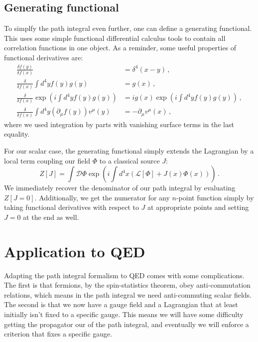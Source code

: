 \documentclass[12pt]{memoir}
\begin{document}
\subsection{Generating functional}

To simplfy the path integral even further, one can define a generating functional.
This uses some simple functional differential calculus tools to contain all correlation functions in one object.
As a reminder, some useful properties of functional derivatives are:
\begin{align}
  \frac{\delta f(y)}{\delta f(x)} & = \delta^4(x - y)\,, \\
  \frac{\delta}{\delta f(x)} \int d^4y f(y) g(y) &= g(x)\,, \\
  \frac{\delta}{\delta f(x)} \exp(i \int d^4y f(y) g(y)) &= i g(x) \exp(i \int d^4y f(y) g(y))\,, \\
  \frac{\delta}{\delta f(x)} \int d^4y (\partial_{\mu} f(y)) v^{\mu}(y) & = - \partial_{\mu} v^{\mu}(x)\,,
\end{align}
where we used integration by parts with vanishing surface terms in the last equality.

For our scalar case, the generating functional simply extends the Lagrangian
by a local term coupling our field $\Phi$ to a classical source $J$:
\begin{equation}
  Z[J] = \int \mathcal{D}\Phi \exp(i \int d^4x (\mathcal{L}[\Phi] + J(x) \Phi(x)))\,.
\end{equation}
We immediately recover the denominator of our path integral by evaluating $Z[J=0]$.
Additionally, we get the numerator for any $n$-point function
simply by taking functional derivatives with respect to $J$ at appropriate points
and setting $J=0$ at the end as well.

\section{Application to QED}

Adapting the path integral formalism to QED comes with some complications.
The first is that fermions, by the spin-statistics theorem, obey anti-commutation relations,
which means in the path integral we need anti-commuting scalar fields.
The second is that we now have a gauge field
and a Lagrangian that at least initially isn't fixed to a specific gauge.
This means we will have some difficulty getting the propagator our of the path integral,
and eventually we will enforce a criterion that fixes a specific gauge.
\end{document}
